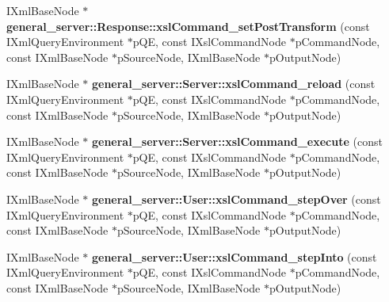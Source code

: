 \begin{DoxyCompactItemize}
\item 
\hypertarget{group__XSLModule-Commands_gaf57f947df9e59a4c76fc99add19b87ae}{\-I\-Xml\-Base\-Node $\ast$ {\bfseries general\-\_\-server\-::\-Response\-::xsl\-Command\-\_\-set\-Post\-Transform} (const \-I\-Xml\-Query\-Environment $\ast$p\-Q\-E, const \-I\-Xsl\-Command\-Node $\ast$p\-Command\-Node, const \-I\-Xml\-Base\-Node $\ast$p\-Source\-Node, \-I\-Xml\-Base\-Node $\ast$p\-Output\-Node)}\label{group__XSLModule-Commands_gaf57f947df9e59a4c76fc99add19b87ae}

\item 
\hypertarget{group__XSLModule-Commands_ga4dab2f43bb9bc69947c44479568cfa03}{\-I\-Xml\-Base\-Node $\ast$ {\bfseries general\-\_\-server\-::\-Server\-::xsl\-Command\-\_\-reload} (const \-I\-Xml\-Query\-Environment $\ast$p\-Q\-E, const \-I\-Xsl\-Command\-Node $\ast$p\-Command\-Node, const \-I\-Xml\-Base\-Node $\ast$p\-Source\-Node, \-I\-Xml\-Base\-Node $\ast$p\-Output\-Node)}\label{group__XSLModule-Commands_ga4dab2f43bb9bc69947c44479568cfa03}

\item 
\hypertarget{group__XSLModule-Commands_ga13bc0c51c747cf88f1debafae5ff16c0}{\-I\-Xml\-Base\-Node $\ast$ {\bfseries general\-\_\-server\-::\-Server\-::xsl\-Command\-\_\-execute} (const \-I\-Xml\-Query\-Environment $\ast$p\-Q\-E, const \-I\-Xsl\-Command\-Node $\ast$p\-Command\-Node, const \-I\-Xml\-Base\-Node $\ast$p\-Source\-Node, \-I\-Xml\-Base\-Node $\ast$p\-Output\-Node)}\label{group__XSLModule-Commands_ga13bc0c51c747cf88f1debafae5ff16c0}

\item 
\hypertarget{group__XSLModule-Commands_gaa2c2aa35950f336eaa555459f9e55131}{\-I\-Xml\-Base\-Node $\ast$ {\bfseries general\-\_\-server\-::\-User\-::xsl\-Command\-\_\-step\-Over} (const \-I\-Xml\-Query\-Environment $\ast$p\-Q\-E, const \-I\-Xsl\-Command\-Node $\ast$p\-Command\-Node, const \-I\-Xml\-Base\-Node $\ast$p\-Source\-Node, \-I\-Xml\-Base\-Node $\ast$p\-Output\-Node)}\label{group__XSLModule-Commands_gaa2c2aa35950f336eaa555459f9e55131}

\item 
\hypertarget{group__XSLModule-Commands_ga57c2d185df0534c3756af28d6e80b281}{\-I\-Xml\-Base\-Node $\ast$ {\bfseries general\-\_\-server\-::\-User\-::xsl\-Command\-\_\-step\-Into} (const \-I\-Xml\-Query\-Environment $\ast$p\-Q\-E, const \-I\-Xsl\-Command\-Node $\ast$p\-Command\-Node, const \-I\-Xml\-Base\-Node $\ast$p\-Source\-Node, \-I\-Xml\-Base\-Node $\ast$p\-Output\-Node)}\label{group__XSLModule-Commands_ga57c2d185df0534c3756af28d6e80b281}


\end{DoxyCompactItemize}
